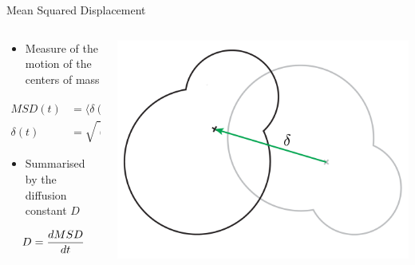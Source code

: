 \documentclass[16pt, aspectratio=43,compress]{beamer}
\begin{document}
\begin{frame}{Mean Squared Displacement}
    \begin{columns}
        \begin{column}{0.5\linewidth}
            \begin{itemize}
                \item Measure of the motion of the centers of mass
            \end{itemize}
            \begin{align*}
                MSD(t) &= \langle \delta(t)^2 \rangle,\\
                \delta(t) &= \sqrt{(x(t) - x_0)^2 + (y(t) - y_0)^2}
            \end{align*}
            \begin{itemize}
                \item Summarised by the diffusion constant $D$
            \end{itemize}
            \begin{align*}
                D = \frac{d MSD}{d t}
            \end{align*}
        \end{column}
        \begin{column}{0.5\linewidth}
            \includegraphics[width=\textwidth]{msd}
        \end{column}
    \end{columns}
\end{frame}
\end{document}
